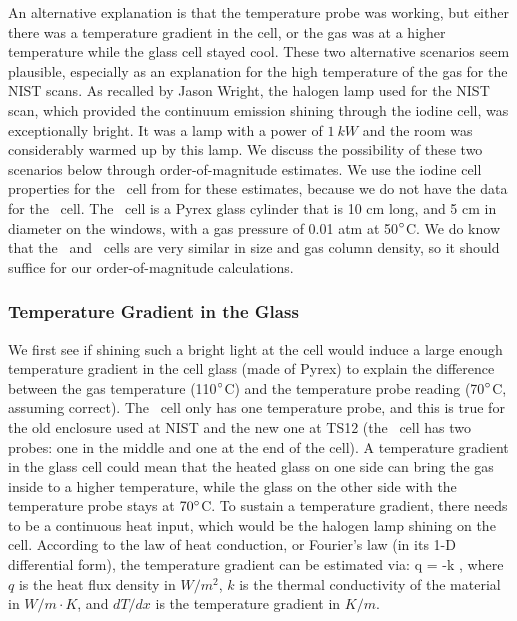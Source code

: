 An alternative explanation is that the temperature probe was working,
but either there was a temperature gradient in the cell, or the gas
was at a higher temperature while the glass cell stayed cool. These
two alternative scenarios seem plausible, especially as an explanation
for the high temperature of the gas for the NIST scans. As recalled by
Jason Wright, the halogen lamp used for the NIST scan, which provided
the continuum emission shining through the iodine cell, was
exceptionally bright. It was a lamp with a power of $1\ kW$ and the
room was considerably warmed up by this lamp. We discuss the
possibility of these two scenarios below through order-of-magnitude
estimates. We use the iodine cell properties for the \keck\ cell from
\cite{butler1996} for these estimates, because we do not have the data
for the \het\ cell. The \keck\ cell is a Pyrex glass cylinder that is
10 cm long, and 5 cm in diameter on the windows, with a gas pressure
of 0.01 atm at 50$^{\circ}$C. We do know that the \keck\ and \het\
cells are very similar in size and gas column density, so it should suffice
for our order-of-magnitude calculations.


\subsubsection{Temperature Gradient in the Glass}

We first see if shining such a bright light at the cell would induce a
large enough temperature gradient in the cell glass (made of
Pyrex) to explain the difference between the gas temperature
(110$^{\circ}$C) and the temperature probe reading (70$^{\circ}$C,
assuming correct). The \het\ cell only has one temperature probe, and
this is true for the old enclosure used at NIST and the new one at
TS12 (the \keck\ cell has two probes: one in the middle and one at the
end of the cell). A temperature gradient in the glass cell could mean
that the heated glass on one side can bring the gas inside to a higher
temperature, while the glass on the other side with the temperature
probe stays at $70^{\circ}$C. To sustain a temperature gradient, there
needs to be a continuous heat input, which would be the halogen lamp
shining on the cell. According to the law of heat conduction, or
Fourier's law (in its 1-D differential form), the temperature gradient
can be estimated via: 
\beq
q = -k ,
\eeq
where $q$ is the heat flux density in $W/m^2$, $k$ is the thermal
conductivity of the material in $W/m \cdot K$, and $dT/dx$ is the
temperature gradient in $K/m$.

